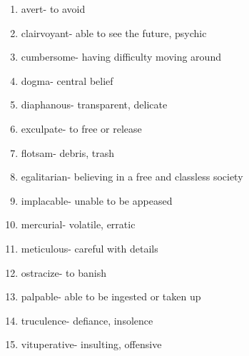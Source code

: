 \begin{enumerate}

\item avert- to avoid

\item clairvoyant- able to see the future, psychic 

\item cumbersome- having difficulty moving around

\item dogma- central belief 

\item diaphanous- transparent, delicate

\item exculpate- to free or release

\item flotsam- debris, trash

\item egalitarian- believing in a free and classless society

\item implacable- unable to be appeased

\item mercurial- volatile, erratic

\item meticulous- careful with details

\item ostracize- to banish

\item palpable- able to be ingested or taken up

\item truculence- defiance, insolence

\item vituperative- insulting, offensive

\end{enumerate}